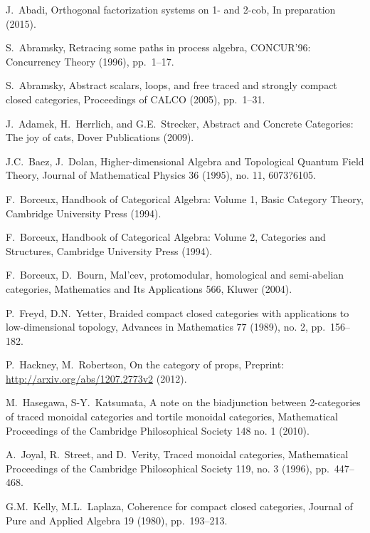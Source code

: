 \documentclass[11pt,oneside,article]{memoir}
\begin{document}
\begin{thebibliography}{XXX}

 J.~Abadi, Orthogonal factorization systems on 1- and 2-cob, In preparation (2015).

 S.~Abramsky, Retracing some paths in process algebra, CONCUR'96: Concurrency Theory (1996), pp.~1--17.

 S.~Abramsky, Abstract scalars, loops, and free traced and strongly compact closed categories, Proceedings of CALCO (2005), pp.~1--31.

 J.~Adamek, H.~Herrlich, and G.E.~Strecker, Abstract and Concrete Categories: The joy of cats, Dover Publications (2009).

 J.C.~Baez, J.~Dolan, Higher-dimensional Algebra and Topological Quantum Field Theory, Journal of Mathematical Physics 36 (1995), no. 11, 6073?6105.

F.~Borceux, Handbook of Categorical Algebra: Volume 1, Basic Category Theory, Cambridge University Press (1994).

 F.~Borceux, Handbook of Categorical Algebra: Volume 2, Categories and Structures, Cambridge University Press (1994).

 F.~Borceux, D.~Bourn, Mal'cev, protomodular, homological and semi-abelian categories, Mathematics
 and Its Applications 566, Kluwer (2004).

 P.~Freyd, D.N.~Yetter, Braided compact closed categories with applications to low-dimensional topology,
Advances in Mathematics 77 (1989), no. 2, pp.~156--182.

 P.~Hackney, M.~Robertson, On the category of props, Preprint: \url{http://arxiv.org/abs/1207.2773v2} (2012).

M.~Hasegawa, S-Y.~Katsumata, A note on the biadjunction between 2-categories of traced monoidal categories and tortile monoidal categories, Mathematical Proceedings of the Cambridge Philosophical Society 148 no. 1 (2010).

 A.~Joyal, R.~Street, and D.~Verity, Traced monoidal categories, Mathematical Proceedings of the Cambridge Philosophical Society 119, no. 3 (1996), pp.~447--468.

 G.M.~Kelly, M.L.~Laplaza, Coherence for compact closed categories, Journal of Pure and Applied Algebra 19 (1980), pp.~193--213.


\end{thebibliography}
\end{document}

